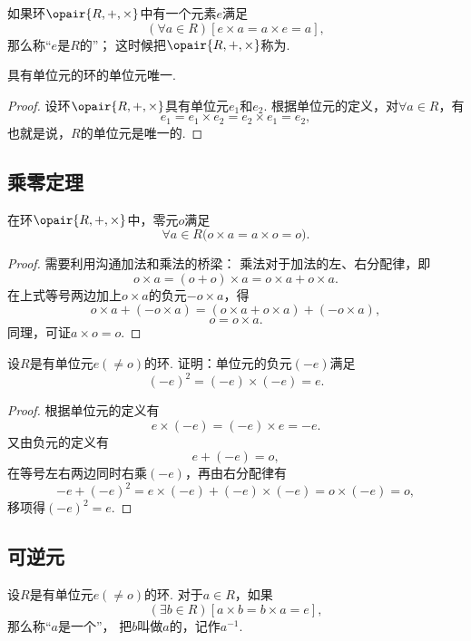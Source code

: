 \begin{definition}
如果环\(\opair{R,+,\times}\)中有一个元素\(e\)满足\[
	(\forall a \in R)[e \times a = a \times e = a],
\]
那么称“\(e\)是\(R\)的”；
这时候把\(\opair{R,+,\times}\)称为.
\end{definition}

\begin{property}
具有单位元的环的单位元唯一.
\begin{proof}
设环\(\opair{R,+,\times}\)具有单位元\(e_1\)和\(e_2\).
根据单位元的定义，对\(\forall a \in R\)，有\[
    e_1 = e_1 \times e_2 = e_2 \times e_1 = e_2,
\]
也就是说，\(R\)的单位元是唯一的.
\end{proof}
\end{property}

\subsection{乘零定理}
\begin{theorem}[乘零定理]
在环\(\opair{R,+,\times}\)中，零元\(o\)满足\[
    \forall a \in R \bigl( o \times a = a \times o = o \bigr).
\]
\begin{proof}
需要利用沟通加法和乘法的桥梁：
乘法对于加法的左、右分配律，即\[
    o \times a = (o + o) \times a = o \times a + o \times a.
\]在上式等号两边加上\(o \times a\)的负元\(-o \times a\)，得\[
    o \times a + (- o \times a) = (o \times a + o \times a) + (- o \times a),
\]\[
    o = o \times a.
\]
同理，可证\(a \times o = o\).
\end{proof}
\end{theorem}

\begin{example}
设\(R\)是有单位元\(e(\neq o)\)的环.
证明：单位元的负元\((-e)\)满足\[
    (-e)^2=(-e)\times(-e)=e.
\]
\begin{proof}
根据单位元的定义有\[
    e \times (-e) = (-e) \times e = -e.
\]
又由负元的定义有\[
    e + (-e) = o,
\]
在等号左右两边同时右乘\((-e)\)，再由右分配律有\[
    -e + (-e)^2 = e \times (-e) + (-e) \times (-e) = o \times (-e) = o,
\]
移项得\((-e)^2 = e\).
\end{proof}
\end{example}

\subsection{可逆元}
\begin{definition}
设\(R\)是有单位元\(e(\neq o)\)的环.
对于\(a \in R\)，如果\[
	(\exists b \in R)[a \times b = b \times a = e],
\]
那么称“\(a\)是一个”，
把\(b\)叫做\(a\)的，记作\(a^{-1}\).
\end{definition}

